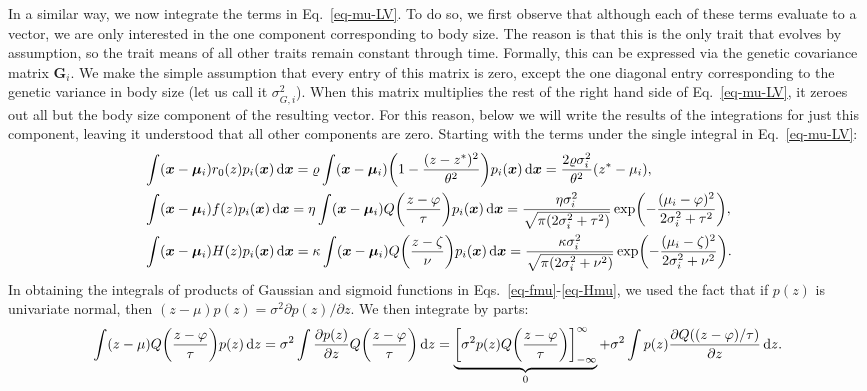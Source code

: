 \documentclass[9pt,twoside,lineno]{pnas-new}
\newcommand{\ud}{\text{d}}
\let\originalleft\left
\let\originalright\right
\renewcommand{\left}{\mathopen{}\mathclose\bgroup\originalleft}
\renewcommand{\right}{\aftergroup\egroup\originalright}
\newcommand{\mat}[1]{\bm{#1}}
\begin{document}
In a similar way, we now integrate the terms in Eq.~\ref{eq-mu-LV}. To do so, we first observe that although each of these terms evaluate to a vector, we are only interested in the one component corresponding to body size. The reason is that this is the only trait that evolves by assumption, so the trait means of all other traits remain constant through time. Formally, this can be expressed via the genetic covariance matrix $\mat{G}_i$. We make the simple assumption that every entry of this matrix is zero, except the one diagonal entry corresponding to the genetic variance in body size (let us call it $\sigma_{G,i}^2$). When this matrix multiplies the rest of the right hand side of Eq.~\ref{eq-mu-LV}, it zeroes out all but the body size component of the resulting vector. For this reason, below we will write the results of the integrations for just this component, leaving it understood that all other components are zero. Starting with the terms under the single integral in Eq.~\ref{eq-mu-LV}:
\begin{align}
  \label{eq-r0mu}
  & \int (\mat{x} - \mat{\mu}_i) r_0(z) p_i(\mat{x}) \,\ud\mat{x}
  = \varrho \int (\mat{x} - \mat{\mu}_i)
  \left( 1 - \frac{(z-z^*)^2}{\theta^{2}} \right)
  p_i(\mat{x}) \,\ud\mat{x}
  = \frac{2\varrho\sigma_i^2}{\theta^2} \left(z^*-\mu_i\right),\\
  \label{eq-fmu}
  & \int (\mat{x} - \mat{\mu}_i) f(z) p_i(\mat{x}) \,\ud\mat{x}
  = \eta \int (\mat{x} - \mat{\mu}_i)
  Q\left( \frac{z-\varphi}{\tau} \right) 
  p_i(\mat{x})\,\ud\mat{x}
  = \frac{\eta\sigma_i^2}{\sqrt{\pi(2\sigma_i^2+\tau^2)}}
  \exp\left(-\frac{(\mu_i-\varphi)^2}{2\sigma_i^2+\tau^2} \right),\\
  \label{eq-Hmu}
  & \int (\mat{x} - \mat{\mu}_i) H(z) p_i(\mat{x}) \,\ud\mat{x}
  = \kappa \int (\mat{x} - \mat{\mu}_i)
  Q\left( \frac{z-\zeta}{\nu} \right) p_i(\mat{x}) \,\ud\mat{x}
  = \frac{\kappa\sigma_i^2}{\sqrt{\pi(2\sigma_i^2+\nu^2)}}
  \exp\left( -\frac{(\mu_i-\zeta)^2}{2\sigma_i^2+\nu^2} \right) .
\end{align}
In obtaining the integrals of products of Gaussian and sigmoid functions in Eqs.~\ref{eq-fmu}-\ref{eq-Hmu}, we used the fact that if $p(z)$ is univariate normal, then $(z-\mu) p(z) = \sigma^2 \partial p(z) / \partial z$. We then integrate by parts:
\begin{equation}
  \label{eq-intbyparts}
  \int (z-\mu) Q\left(\frac{z-\varphi}{\tau}\right) p(z) \,\ud z
  = \sigma^2 \int \frac{\partial p(z)}{\partial z}
  Q\left(\frac{z-\varphi}{\tau}\right) \,\ud z
  = \underbrace{\left[\sigma^2 p(z) Q\left(\frac{z-\varphi}
  {\tau}\right) \right]_{-\infty}^{\infty}}_{0}
  + \sigma^2 \int p(z)
  \frac{\partial Q((z-\varphi)/\tau)}{\partial z} \,\ud z .
\end{equation}
\end{document}
